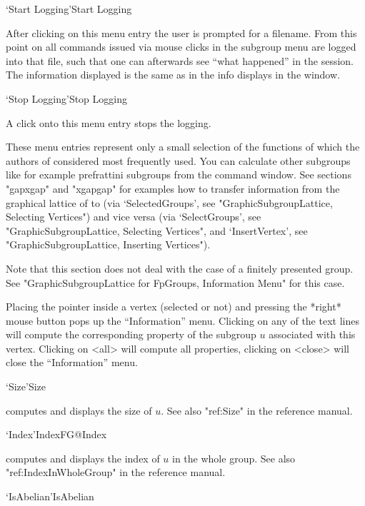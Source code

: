 \>`Start Logging'{Start Logging}

After clicking on this menu entry the user is prompted for a filename. From 
this point on all commands issued via mouse clicks in the subgroup menu are 
logged into that file, such that one can afterwards see ``what happened''
in the {\XGAP} session. The information displayed is the same as in the
info displays in the {\GAP} window. 

\>`Stop Logging'{Stop Logging}

A click onto this menu entry stops the {\XGAP} logging.

\bigskip

These menu entries represent only a small selection of the functions
of {\GAP} which the authors of {\XGAP} considered most frequently
used. You can calculate other subgroups like for example prefrattini
subgroups from the {\GAP} command window. See sections "gapxgap" and
"xgapgap" for examples how to transfer information from the graphical
lattice of {\XGAP} to {\GAP} (via `SelectedGroups', see
"GraphicSubgroupLattice, Selecting Vertices") and vice versa (via
`SelectGroups', see "GraphicSubgroupLattice, Selecting Vertices", and
`InsertVertex', see "GraphicSubgroupLattice, Inserting Vertices").



Note that this section does not deal with the case of a finitely presented
group. See "GraphicSubgroupLattice for FpGroups, Information Menu" for this 
case.

Placing the pointer  inside a vertex (selected  or not)  and pressing the
*right* mouse button pops up the  ``Information'' menu.  Clicking on any of
the text  lines will compute  the corresponding  property of the subgroup
$u$ associated  with  this vertex.  Clicking   on <all> will  compute all
properties, clicking on <close> will close the ``Information'' menu.

\>`Size'{Size}

computes and displays the size of $u$.  See also "ref:Size" in the
{\GAP} reference manual.

\>`Index'{IndexFG}@{Index}

computes and displays the  index  of $u$ in   the whole group.  See  also
"ref:IndexInWholeGroup" in the {\GAP} reference manual.

\>`IsAbelian'{IsAbelian}

